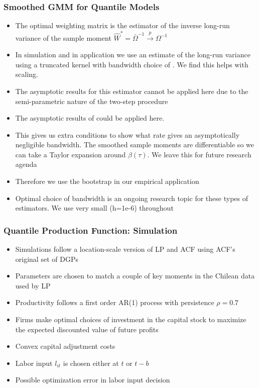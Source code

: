 \documentclass{beamer}
\begin{document}

\begin{frame}
\frametitle{Smoothed GMM for Quantile Models}
\begin{itemize}
	\item The optimal weighting matrix is the estimator of the inverse long-run variance of the sample moment $\hat{W}^{*}=\bar{\Omega}^{-1}\overset{p}{\to}\Omega^{-1}$
	\item In simulation and in application we use an estimate of the long-run variance using a truncated kernel with bandwidth choice of \textcite{Andrews1991}. We find this helps with scaling.
	\item The asymptotic results for this estimator cannot be applied here due to the semi-parametric nature of the two-step procedure
	\item The asymptotic results of \textcite{Ai2007} could be applied here. 
	\item This gives us extra conditions to show what rate gives an asymptotically negligible bandwidth. The smoothed sample moments are differentiable so we can take a Taylor expansion around $\beta(\tau)$. We leave this for future research agenda
	\item Therefore we use the bootstrap in our empirical application
	\item Optimal choice of bandwidth is an ongoing research topic for these types of estimators. We use very small (h=1e-6) throughout 
\end{itemize}
\end{frame}


\begin{frame}
\frametitle{Quantile Production Function: Simulation}
\begin{itemize}
	\item Simulations follow a location-scale version of LP and ACF using ACF's original set of DGPs 
	\item Parameters are chosen to match a couple of key moments in the Chilean data used by LP
	\item Productivity follows a first order AR(1) process with persistence $\rho=0.7$
	\item Firms make optimal choices of investment in the capital stock to maximize the expected discounted value of future profits
	\item Convex capital adjustment costs
	\item Labor input $l_{it}$ is chosen either at $t$ or $t-b$
	\item Possible optimization error in labor input decision
\end{itemize}
\end{frame}
\end{document}
